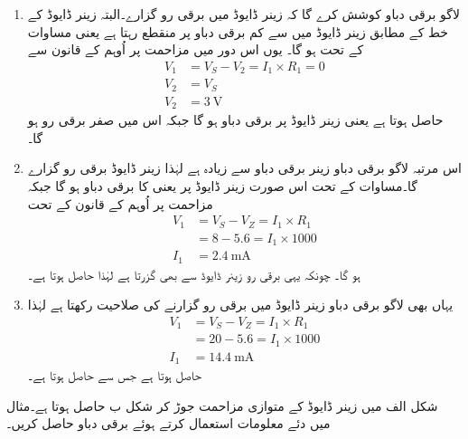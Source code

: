 \begin{enumerate}
\item
لاگو برقی دباو  کوشش کرے گا کہ زینر ڈایوڈ میں برقی رو گزارے۔البتہ زینر ڈایوڈ کے خط کے مطابق زینر ڈایوڈ میں  سے کم برقی دباو پر منقطع رہتا ہے یعنی مساوات   کے تحت   ہو گا۔
یوں اس دور میں مزاحمت  پر  اُوہم کے قانون سے
\begin{align*}
V_1 &=V_S-V_2=I_1 \times R_1 = 0\\
V_2 &=V_S\\
V_2&=\SI{3}{\volt}
\end{align*}
حاصل ہوتا ہے یعنی زینر ڈایوڈ پر   برقی دباو ہو گا جبکہ اس میں صفر برقی  رو ہو گا۔
\item
	اس مرتبہ لاگو برقی دباو زینر برقی دباو سے زیادہ ہے لہٰذا زینر ڈایوڈ برقی رو گزارے گا۔مساوات    کے تحت اس صورت زینر ڈایوڈ پر  یعنی  کا برقی دباو ہو گا جبکہ مزاحمت پر  اُوہم کے قانون کے تحت
\begin{align*}
V_1&=V_S-V_Z =I_1 \times R_1\\
&=8-5.6=I_1 \times 1000\\
I_1&=\SI{2.4}{\milli \ampere}
\end{align*}
ہو گا۔ چونکہ یہی برقی رو زینر ڈایوڈ سے بھی گزرتا ہے لہٰذا   حاصل ہوتا ہے۔
\item
یہاں بھی لاگو برقی دباو زینر ڈایوڈ میں برقی رو گزارنے کی صلاحیت رکھتا ہے لہٰذا
\begin{align*}
V_1&=V_S-V_Z =I_1 \times R_1\\
&=20-5.6=I_1 \times 1000\\
I_1&=\SI{14.4}{\milli \ampere}
\end{align*}
حاصل ہوتا ہے جس سے   حاصل ہوتا ہے۔
\end{enumerate}


شکل  الف میں زینر ڈایوڈ کے متوازی مزاحمت  جوڑ کر شکل  ب حاصل ہوتا ہے۔مثال   میں دئے معلومات استعمال کرتے ہوئے برقی دباو  حاصل کریں۔

